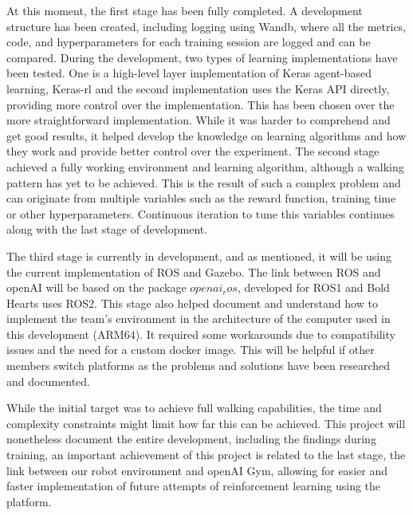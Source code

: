 \documentclass[12pt, a4paper]{article}
\begin{document}
At this moment, the first stage has been fully completed. A development structure has been created, including logging using Wandb, where all the metrics, code, and hyperparameters for each training session are logged and can be compared. 
During the development, two types of learning implementations have been tested. One is a high-level layer implementation of Keras agent-based learning, Keras-rl and the second implementation uses the Keras API directly, providing more control over the implementation. This has been chosen over the more straightforward implementation. While it was harder to comprehend and get good results, it helped develop the knowledge on learning algorithms and how they work and provide better control over the experiment.
The second stage achieved a fully working environment and learning algorithm, although a walking pattern has yet to be achieved. This is the result of such a complex problem and can originate from multiple variables such as the reward function, training time or other hyperparameters. Continuous iteration to tune this variables continues along with the last stage of development.

The third stage is currently in development, and as mentioned, it will be using the current implementation of ROS and Gazebo. The link between ROS and openAI will be based on the package $openai_ros$, developed for ROS1 and Bold Hearts uses ROS2.
This stage also helped document and understand how to implement the team's environment in the architecture of the computer used in this development (ARM64). It required some workarounds due to compatibility issues and the need for a custom docker image. 
This will be helpful if other members switch platforms as the problems and solutions have been researched and documented.

While the initial target was to achieve full walking capabilities, the time and complexity constraints might limit how far this can be achieved. This project will nonetheless document the entire development, including the findings during training, an important achievement of this project is related to the last stage, the link between our robot environment and openAI Gym, allowing for easier and faster implementation of future attempts of reinforcement learning using the platform.
\end{document}
